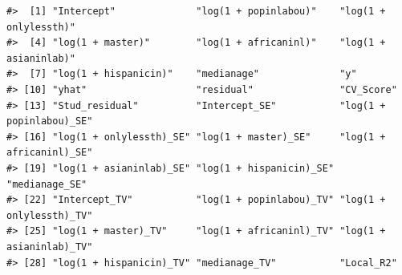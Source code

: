 \documentclass[
  11pt,
]{book}
\newenvironment{Shaded}{\begin{snugshade}}{\end{snugshade}}
\newcommand{\CommentTok}[1]{\textcolor[rgb]{0.56,0.35,0.01}{\textit{#1}}}
\newcommand{\FunctionTok}[1]{\textcolor[rgb]{0.00,0.00,0.00}{#1}}
\newcommand{\NormalTok}[1]{#1}
\newcommand{\SpecialCharTok}[1]{\textcolor[rgb]{0.00,0.00,0.00}{#1}}
\begin{document}
\begin{Shaded}
\end{Shaded}

\begin{verbatim}
#>  [1] "Intercept"              "log(1 + popinlabou)"    "log(1 + onlylessth)"   
#>  [4] "log(1 + master)"        "log(1 + africaninl)"    "log(1 + asianinlab)"   
#>  [7] "log(1 + hispanicin)"    "medianage"              "y"                     
#> [10] "yhat"                   "residual"               "CV_Score"              
#> [13] "Stud_residual"          "Intercept_SE"           "log(1 + popinlabou)_SE"
#> [16] "log(1 + onlylessth)_SE" "log(1 + master)_SE"     "log(1 + africaninl)_SE"
#> [19] "log(1 + asianinlab)_SE" "log(1 + hispanicin)_SE" "medianage_SE"          
#> [22] "Intercept_TV"           "log(1 + popinlabou)_TV" "log(1 + onlylessth)_TV"
#> [25] "log(1 + master)_TV"     "log(1 + africaninl)_TV" "log(1 + asianinlab)_TV"
#> [28] "log(1 + hispanicin)_TV" "medianage_TV"           "Local_R2"
\end{verbatim}
\end{document}

